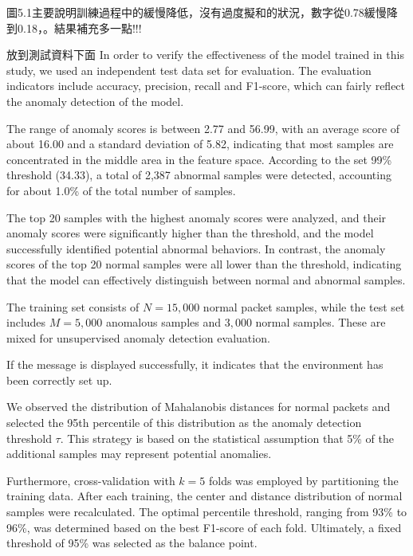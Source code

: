 \begin{ZhChapter}
    圖5.1主要說明訓練過程中的緩慢降低，沒有過度擬和的狀況，數字從0.78緩慢降到0.18，。結果補充多一點!!!



    放到測試資料下面
    In order to verify the effectiveness of the model trained in this study, we used an independent test data set for evaluation. The evaluation indicators include accuracy, precision, recall and F1-score, which can fairly reflect the anomaly detection of the model.

    The range of anomaly scores is between 2.77 and 56.99, with an average score of about 16.00 and a standard deviation of 5.82, indicating that most samples are concentrated in the middle area in the feature space. According to the set 99\% threshold (34.33), a total of 2,387 abnormal samples were detected, accounting for about 1.0\% of the total number of samples.

    The top 20 samples with the highest anomaly scores were analyzed, and their anomaly scores were significantly higher than the threshold, and the model successfully identified potential abnormal behaviors. In contrast, the anomaly scores of the top 20 normal samples were all lower than the threshold, indicating that the model can effectively distinguish between normal and abnormal samples.


    The training set consists of \(N=15,000\) normal packet samples, while the test set includes \(M=5,000\) anomalous samples and \(3,000\) normal samples. These are mixed for unsupervised anomaly detection evaluation.

    If the message is displayed successfully, it indicates that the environment has been correctly set up.

    We observed the distribution of Mahalanobis distances for normal packets and selected the 95th percentile of this distribution as the anomaly detection threshold \(\tau\). This strategy is based on the statistical assumption that 5\% of the additional samples may represent potential anomalies.

    Furthermore, cross-validation with \(k=5\) folds was employed by partitioning the training data. After each training, the center and distance distribution of normal samples were recalculated. The optimal percentile threshold, ranging from 93\% to 96\%, was determined based on the best F1-score of each fold. Ultimately, a fixed threshold of 95\% was selected as the balance point.




\end{ZhChapter}
